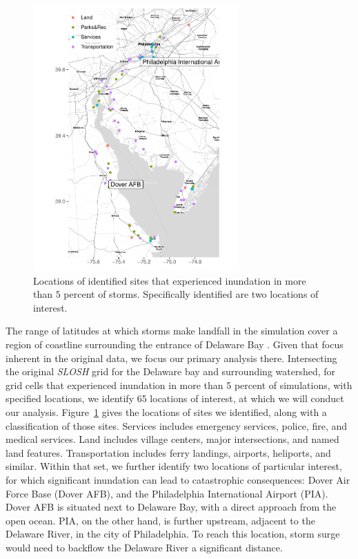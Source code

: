 \begin{figure}[ht]
    \caption{Locations of identified sites that experienced inundation in more than 
        $5$ percent of storms.  Specifically identified are two locations of 
        interest.  \label{map:delawarebay}}
    \centering
    \includegraphics[height=4in]{./plots/delaware}
\end{figure}

The range of latitudes at which storms make landfall in the simulation cover a region of
    coastline surrounding the entrance of Delaware Bay .  Given that focus inherent in the original data, we focus our primary analysis there.
    Intersecting the original \emph{SLOSH} grid for the Delaware bay and surrounding watershed, 
    for grid cells that experienced inundation in more than 5 percent of simulations, 
    with specified locations, we identify 65 locations of interest, at which we will conduct 
    our analysis.  Figure~\ref{map:delawarebay} gives the locations of sites we identified, along
    with a classification of those sites.  Services includes emergency services, police, fire,
    and medical services.  Land includes village centers, major intersections, and named
    land features.  Transportation includes ferry landings, airports, heliports, and similar.
    Within that set, we further identify two locations of particular interest, 
    for which significant inundation can lead to catastrophic consequences:  
    Dover Air Force Base (Dover AFB), and the Philadelphia International 
    Airport (PIA). Dover AFB is situated next to Delaware Bay, with a direct approach from the
    open ocean.  PIA, on the other hand, is further upstream, adjacent to the Delaware River, 
    in the city of Philadelphia.  To reach this location, storm surge would need to backflow 
    the Delaware River a significant distance.

